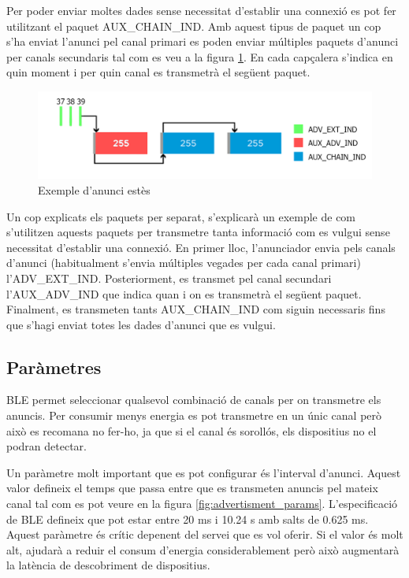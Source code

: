 Per poder enviar moltes dades sense necessitat d'establir una connexió es pot fer utilitzant el paquet AUX\_CHAIN\_IND.
Amb aquest tipus de paquet un cop s'ha enviat l'anunci pel canal primari es poden enviar múltiples paquets d'anunci per canals secundaris tal com es veu a la figura \ref{fig:aux_chain_ind}.
En cada capçalera s'indica en quin moment i per quin canal es transmetrà el següent paquet.

\begin{figure}[h!]
	\begin{center}
		\includegraphics[width=1\textwidth]{./images/aux_chain_ind.png}
		\caption{Exemple d'anunci estès \cite{adv_ext}}
		\label{fig:aux_chain_ind}
	\end{center}
\end{figure}

Un cop explicats els paquets per separat, s'explicarà un exemple de com s'utilitzen aquests paquets per transmetre tanta informació com es vulgui sense necessitat d'establir una connexió.
En primer lloc, l'anunciador envia pels canals d'anunci (habitualment s'envia múltiples vegades per cada canal primari) l'ADV\_EXT\_IND.
Posteriorment, es transmet pel canal secundari l'AUX\_ADV\_IND que indica quan i on es transmetrà el següent paquet.
Finalment, es transmeten tants AUX\_CHAIN\_IND com siguin necessaris fins que s'hagi enviat totes les dades d'anunci que es vulgui.


\subsection{Paràmetres}
BLE permet seleccionar qualsevol combinació de canals per on transmetre els anuncis.
Per consumir menys energia es pot transmetre en un únic canal però això es recomana no fer-ho, ja que si el canal és sorollós, els dispositius no el podran detectar.

Un paràmetre molt important que es pot configurar és l'interval d'anunci.
Aquest valor defineix el temps que passa entre que es transmeten anuncis pel mateix canal tal com es pot veure en la figura \ref{fig:advertisment_params}.
L'especificació de BLE defineix que pot estar entre 20 ms i 10.24 s amb salts de 0.625 ms.
Aquest paràmetre és crític depenent del servei que es vol oferir.
Si el valor és molt alt, ajudarà a reduir el consum d'energia considerablement però això augmentarà la latència de descobriment de dispositius.

